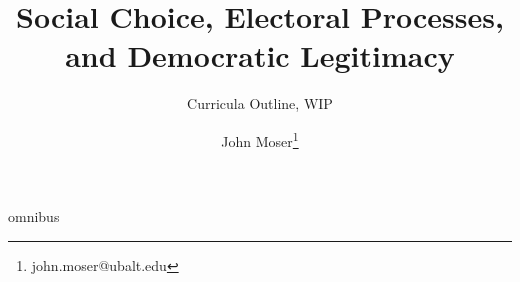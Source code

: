 \documentclass[twoside,titlepage,12pt,appendixprefix=true]{scrreprt}
\begin{document}
    \author{John Moser\thanks{john.moser@ubalt.edu}}

    \title{Social Choice, Electoral Processes, and Democratic Legitimacy}
    \subtitle{Curricula Outline, WIP}

    \printbibliography
    {omnibus}
\end{document}
